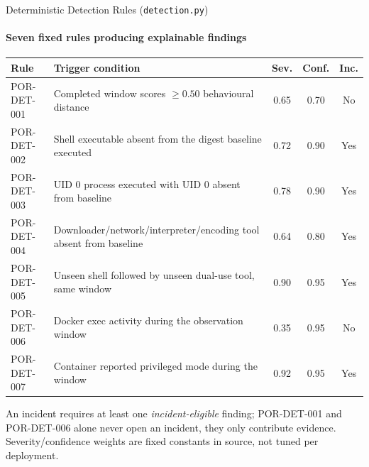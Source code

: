\documentclass[aspectratio=169, 11pt]{beamer}
\begin{document}
\begin{frame}{Deterministic Detection Rules (\texttt{detection.py})}
\framesubtitle{Seven fixed rules producing explainable findings}
\centering
\tiny
\renewcommand{\arraystretch}{1.3}
\begin{tabular}{|l|p{7.8cm}|c|c|c|}
    \hline
    \textbf{Rule} & \textbf{Trigger condition} & \textbf{Sev.} & \textbf{Conf.} & \textbf{Inc.} \\
    \hline
    POR-DET-001 & Completed window scores $\geq 0.50$ behavioural distance & 0.65 & 0.70 & No \\
    \hline
    POR-DET-002 & Shell executable absent from the digest baseline executed & 0.72 & 0.90 & Yes \\
    \hline
    POR-DET-003 & UID 0 process executed with UID 0 absent from baseline & 0.78 & 0.90 & Yes \\
    \hline
    POR-DET-004 & Downloader/network/interpreter/encoding tool absent from baseline & 0.64 & 0.80 & Yes \\
    \hline
    POR-DET-005 & Unseen shell followed by unseen dual-use tool, same window & 0.90 & 0.95 & Yes \\
    \hline
    POR-DET-006 & Docker exec activity during the observation window & 0.35 & 0.95 & No \\
    \hline
    POR-DET-007 & Container reported privileged mode during the window & 0.92 & 0.95 & Yes \\
    \hline
\end{tabular}
\par
\vspace{2mm}
\raggedright
\scriptsize
An incident requires at least one \emph{incident-eligible} finding;
POR-DET-001 and POR-DET-006 alone never open an incident, they only
contribute evidence. Severity/confidence weights are fixed constants in
source, not tuned per deployment.
\end{frame}


\end{document}
